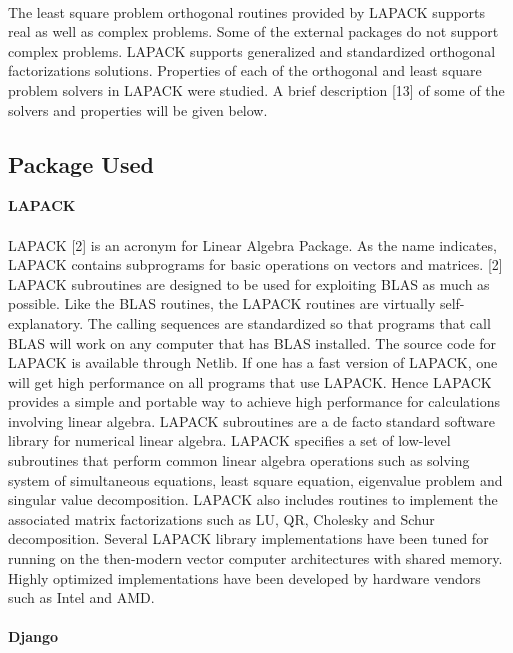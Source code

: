 \documentclass[pdftex,12pt,a4paper]{article}
\begin{document}
\paragraph{}
The least square problem orthogonal routines provided by LAPACK supports real as well as complex problems. Some of the external packages do not support complex problems. LAPACK  supports generalized and standardized orthogonal factorizations solutions. Properties of each of the orthogonal  and least square problem solvers in LAPACK were studied. A brief description [13] of some of the solvers and properties will be given below. 

\subsection{Package Used}

\textbf{LAPACK}
\paragraph{}
LAPACK [2] is an acronym for Linear Algebra Package. As the name indicates, LAPACK contains subprograms for basic operations on vectors and matrices. [2] LAPACK subroutines are designed to be used for exploiting BLAS as much as possible.  Like the BLAS routines, the LAPACK routines are virtually self-explanatory. The calling sequences are standardized so that programs that call BLAS will work on any computer that has BLAS installed. The source code for LAPACK is available through Netlib. If one has a fast version of LAPACK, one will  get high performance on all programs that use LAPACK. Hence LAPACK provides a simple and portable way to achieve high performance for calculations involving linear algebra. 
LAPACK subroutines are a de facto standard software library for numerical linear algebra. LAPACK specifies a set of low-level subroutines that perform common linear algebra operations such as solving system of simultaneous equations, least square equation, eigenvalue problem and singular value decomposition. LAPACK also  includes routines to implement the associated matrix factorizations such as LU, QR, Cholesky and Schur decomposition. 
Several LAPACK library implementations have been tuned for running on the then-modern vector computer architectures with shared memory. Highly optimized implementations have been developed by hardware vendors such as Intel and AMD. \\
\\
\textbf{Django}
\end{document}
